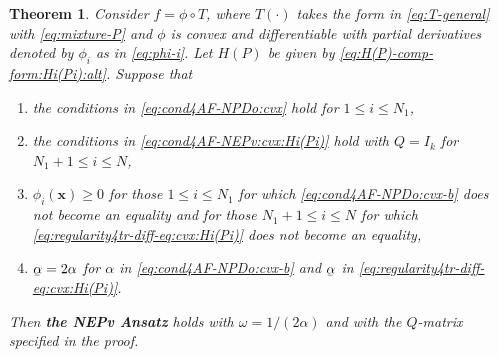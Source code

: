 \documentclass[11pt]{article}
\def\bx{\pmb{x}}
\def\scrH{\mathscr{H}}
\newcommand\munderbar[1]{%
  \underaccent{\bar}{#1}}
\newtheorem{theorem}{Theorem}[section]
\theoremstyle{definition}
\numberwithin{equation}{section}
\begin{document}
\begin{theorem}\label{thm:main-NEPv-cvx:Hi(Pi)}
Consider $f=\phi\circ T$, where $T(\cdot)$ takes the form in \eqref{eq:T-general}
with \eqref{eq:mixture-P} and $\phi$
is convex and differentiable with partial derivatives denoted by
$\phi_i$ as in \eqref{eq:phi-i}. Let $H(P)$ be given by \eqref{eq:H(P)-comp-form:Hi(Pi):alt}.
Suppose that
\begin{enumerate}[{\rm (i)}]
  \item the conditions in \eqref{eq:cond4AF-NPDo:cvx} hold for $1\le i\le N_1$,
  \item the conditions in \eqref{eq:cond4AF-NEPv:cvx:Hi(Pi)} hold with $Q=I_k$ for $N_1+1\le i\le N$,
  \item $\phi_i(\bx)\ge 0$ for those $1\le i\le N_1$
        for which \eqref{eq:cond4AF-NPDo:cvx-b} does not become an equality
        and for those $N_1+1\le i\le N$
        for which \eqref{eq:regularity4tr-diff-eq:cvx:Hi(Pi)} does not become an equality,
  \item $\munderbar\alpha=2\alpha$ for $\alpha$ in \eqref{eq:cond4AF-NPDo:cvx-b}
        and $\munderbar\alpha$ in \eqref{eq:regularity4tr-diff-eq:cvx:Hi(Pi)}.
\end{enumerate}
Then {\bf the NEPv Ansatz} holds  with $\omega=1/(2\alpha)$ and with the $Q$-matrix
specified in the proof.
\end{theorem}
\end{document}
